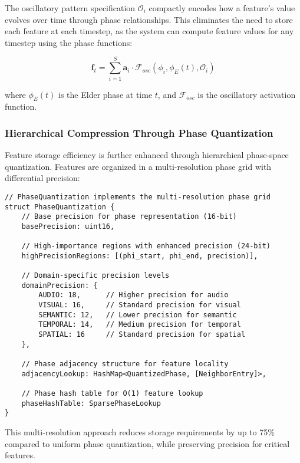 The oscillatory pattern specification $\mathcal{O}_i$ compactly encodes how a feature's value evolves over time through phase relationships. This eliminates the need to store each feature at each timestep, as the system can compute feature values for any timestep using the phase functions:

\begin{equation}
\mathbf{f}_t = \sum_{i=1}^{S} \mathbf{a}_i \cdot \mathcal{F}_{osc}(\phi_i, \phi_E(t), \mathcal{O}_i)
\end{equation}

where $\phi_E(t)$ is the Elder phase at time $t$, and $\mathcal{F}_{osc}$ is the oscillatory activation function.

\subsubsection{Hierarchical Compression Through Phase Quantization}

Feature storage efficiency is further enhanced through hierarchical phase-space quantization. Features are organized in a multi-resolution phase grid with differential precision:

\begin{lstlisting}[caption=Hierarchical Phase Quantization]
// PhaseQuantization implements the multi-resolution phase grid
struct PhaseQuantization {
    // Base precision for phase representation (16-bit)
    basePrecision: uint16,
    
    // High-importance regions with enhanced precision (24-bit)
    highPrecisionRegions: [(phi_start, phi_end, precision)],
    
    // Domain-specific precision levels
    domainPrecision: {
        AUDIO: 18,      // Higher precision for audio
        VISUAL: 16,     // Standard precision for visual 
        SEMANTIC: 12,   // Lower precision for semantic
        TEMPORAL: 14,   // Medium precision for temporal
        SPATIAL: 16     // Standard precision for spatial
    },
    
    // Phase adjacency structure for feature locality
    adjacencyLookup: HashMap<QuantizedPhase, [NeighborEntry]>,
    
    // Phase hash table for O(1) feature lookup
    phaseHashTable: SparsePhaseLookup
}
\end{lstlisting}

This multi-resolution approach reduces storage requirements by up to 75\% compared to uniform phase quantization, while preserving precision for critical features.

